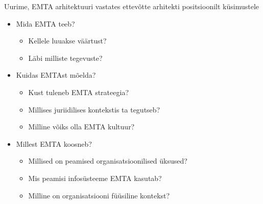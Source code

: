 \documentclass[nobib]{tufte-handout}
\begin{document}
Uurime, EMTA arhitektuuri vastates ettevõtte arhitekti positsioonilt küsimustele
\begin{itemize}
	\item Mida EMTA teeb?
	\begin{itemize}
		\item Kellele luuakse väärtust?
		\item Läbi milliste tegevuste?
	\end{itemize}
	\item Kuidas EMTAst mõelda?
	\begin{itemize}
		\item Kust tuleneb EMTA strateegia?
		\item Millises juriidilises kontekstis ta tegutseb?
		\item Milline võiks olla EMTA kultuur?
	\end{itemize}
	\item Millest EMTA koosneb?
	\begin{itemize}
		\item Millised on peamised organisatsioonilised üksused?
		\item Mis peamisi infosüsteeme EMTA kasutab?
		\item Milline on organisatsiooni füüsiline kontekst?
	\end{itemize}
\end{itemize}
\end{document}
